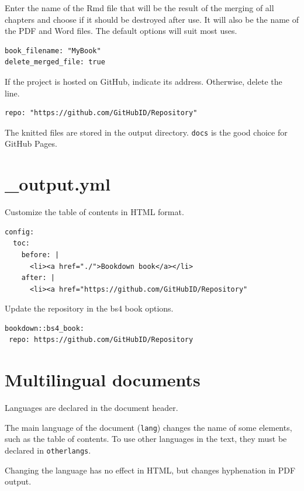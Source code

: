 \documentclass[
  12pt,
  american,
  a4paper,
  extrafontsizes,onecolumn,openright
  ]{memoir}
\begin{document}
Enter the name of the Rmd file that will be the result of the merging of all chapters and choose if it should be destroyed after use.
It will also be the name of the PDF and Word files.
The default options will suit most uses.

\begin{verbatim}
book_filename: "MyBook"
delete_merged_file: true
\end{verbatim}

If the project is hosted on GitHub, indicate its address.
Otherwise, delete the line.

\begin{verbatim}
repo: "https://github.com/GitHubID/Repository"
\end{verbatim}

The knitted files are stored in the output directory.
\texttt{docs} is the good choice for GitHub Pages.

\hypertarget{output.yml}{%
\section{\_output.yml}\label{output.yml}}

Customize the table of contents in HTML format.

\begin{verbatim}
config:
  toc:
    before: |
      <li><a href="./">Bookdown book</a></li>
    after: |
      <li><a href="https://github.com/GitHubID/Repository"
\end{verbatim}

Update the repository in the bs4 book options.

\begin{verbatim}
bookdown::bs4_book:
 repo: https://github.com/GitHubID/Repository
\end{verbatim}

\hypertarget{multilingual-documents}{%
\section{Multilingual documents}\label{multilingual-documents}}

Languages are declared in the document header.

The main language of the document (\texttt{lang}) changes the name of some elements, such as the table of contents.
To use other languages in the text, they must be declared in \texttt{otherlangs}.

Changing the language has no effect in HTML, but changes hyphenation in PDF output.
\end{document}
